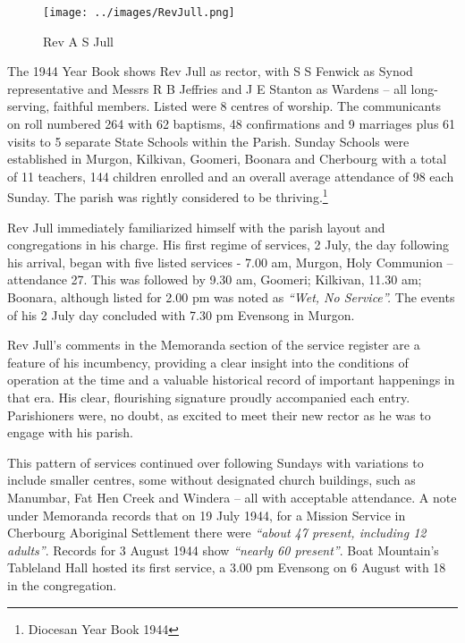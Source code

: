 \begin{figure}
\begin{center}
\texttt{[image: ../images/RevJull.png]}
\caption{Rev A S Jull}
\end{center}
\end{figure}




The 1944 Year Book shows Rev Jull as rector, with S S Fenwick as Synod representative and Messrs R B Jeffries and J E Stanton as Wardens -- all long-serving, faithful members. Listed were 8 centres of worship. The communicants on roll numbered 264 with 62 baptisms, 48 confirmations and 9 marriages plus 61 visits to 5 separate State Schools within the Parish. Sunday Schools were established in Murgon, Kilkivan, Goomeri, Boonara and Cherbourg with a total of 11 teachers, 144 children enrolled and an overall average attendance of 98 each Sunday. The parish was rightly considered to be thriving.\footnote{Diocesan Year Book 1944}


Rev Jull immediately familiarized himself with the parish layout and congregations in his charge. His first regime of services, 2 July, the day following his arrival, began with five listed services - 7.00 am, Murgon, Holy Communion -- attendance 27. This was followed by 9.30 am, Goomeri; Kilkivan, 11.30 am; Boonara, although listed for 2.00 pm was noted as \emph{``Wet, No Service''.} The events of his 2 July day concluded with 7.30 pm Evensong in Murgon.



Rev Jull's comments in the Memoranda section of the service register are a feature of his incumbency, providing a clear insight into the conditions of operation at the time and a valuable historical record of important happenings in that era. His clear, flourishing signature proudly accompanied each entry. Parishioners were, no doubt, as excited to meet their new rector as he was to engage with his parish.



This pattern of services continued over following Sundays with variations to include smaller centres, some without designated church buildings, such as Manumbar, Fat Hen Creek and Windera -- all with acceptable attendance. A note under Memoranda records that on 19 July 1944, for a Mission Service in Cherbourg Aboriginal Settlement there were \emph{``about 47 present, including 12 adults''}. Records for 3 August 1944 show \emph{``nearly 60 present''}. Boat Mountain's Tableland Hall hosted its first service, a 3.00 pm Evensong on 6 August with 18 in the congregation.




